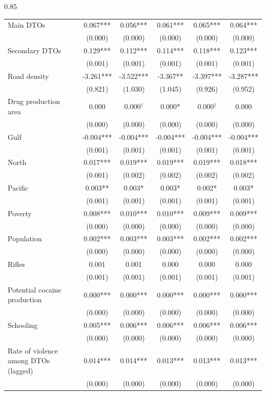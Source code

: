 \documentclass[12pt,letterpaper]{article}
\begin{document}
\begin{landscape}
\begin{center}
\begin{spacing}{0.85}
\begin{longtable}{lccccc}
Main DTOs & 0.067*** & 0.056*** & 0.061*** & 0.065*** & 0.064*** \\
 & (0.000)  & (0.000)  & (0.000)  & (0.000)  & (0.000)  \\
Secondary DTOs & 0.129*** & 0.112*** & 0.114*** & 0.118*** & 0.123*** \\
 & (0.001)  & (0.001)  & (0.001)  & (0.001)  & (0.001)  \\
Road density & -3.261*** & -3.522*** & -3.367** & -3.397*** & -3.287*** \\
 & (0.821)  & (1.030)  & (1.045)  & (0.926)  & (0.952)  \\
Drug production area & 0.000  & 0.000$^{\dag}$& 0.000* & 0.000$^{\dag}$& 0.000  \\
 & (0.000)  & (0.000)  & (0.000)  & (0.000)  & (0.000)  \\
Gulf & -0.004*** & -0.004*** & -0.004*** & -0.004*** & -0.004*** \\
 & (0.001)  & (0.001)  & (0.001)  & (0.001)  & (0.001)  \\
North & 0.017*** & 0.019*** & 0.019*** & 0.019*** & 0.018*** \\
 & (0.001)  & (0.002)  & (0.002)  & (0.002)  & (0.002)  \\
Pacific & 0.003** & 0.003* & 0.003* & 0.002* & 0.003* \\
 & (0.001)  & (0.001)  & (0.001)  & (0.001)  & (0.001)  \\
Poverty & 0.008*** & 0.010*** & 0.010*** & 0.009*** & 0.009*** \\
 & (0.000)  & (0.000)  & (0.000)  & (0.000)  & (0.000)  \\
Population & 0.002*** & 0.003*** & 0.003*** & 0.002*** & 0.002*** \\
 & (0.000)  & (0.000)  & (0.000)  & (0.000)  & (0.000)  \\
                
Rifles & 0.001  & 0.001  & 0.000  & 0.000  & 0.000  \\
 & (0.001)  & (0.001)  & (0.001)  & (0.001)  & (0.001)  \\
               
Potential cocaine production & 0.000*** & 0.000*** & 0.000*** & 0.000*** & 0.000*** \\
 & (0.000)  & (0.000)  & (0.000)  & (0.000)  & (0.000)  \\
Schooling & 0.005*** & 0.006*** & 0.006*** & 0.006*** & 0.006*** \\
 & (0.000)  & (0.000)  & (0.000)  & (0.000)  & (0.000)  \\
Rate of violence among DTOs (lagged) & 0.014*** & 0.014*** & 0.013*** & 0.013*** & 0.013*** \\
 & (0.000)  & (0.000)  & (0.000)  & (0.000)  & (0.000)  \\
             

\end{longtable}
\end{spacing}
\end{center}
\end{landscape}
\end{document}
